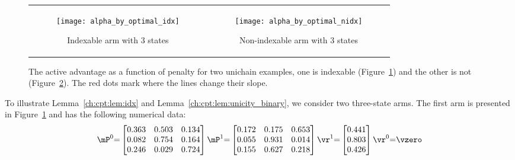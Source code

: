 \begin{figure}[ht]
    \begin{tabular}{cc}
        \begin{subfigure}[t]{0.48\linewidth}
            \texttt{[image: alpha\_by\_optimal\_idx]}
            \caption{Indexable arm with $3$ states}
            \label{fig:illustrate_vf}
        \end{subfigure}
        &\begin{subfigure}[t]{0.48\linewidth}
            \texttt{[image: alpha\_by\_optimal\_nidx]}
            \caption{Non-indexable arm with $3$ states}
            \label{fig:illustrate_non_indexable}
        \end{subfigure}            
    \end{tabular}
    \caption{
        The active advantage as a function of penalty for two unichain examples, one is indexable (Figure~\ref{fig:illustrate_vf}) and the other is not (Figure~\ref{fig:illustrate_non_indexable}).
        The red dots mark where the lines change their slope.
    }
    \label{fig:illustrate_indexability}
\end{figure}

To illustrate Lemma~\ref{ch:cpt:lem:idx} and Lemma~\ref{ch:cpt:lem:unicity_binary}, we consider two three-state arms.
The first arm is presented in Figure~\ref{fig:illustrate_vf} and has the following numerical data:
\begin{equation*}
    \mP^0{=}\begin{bmatrix}
        0.363 & 0.503 & 0.134 \\
        0.082 & 0.754 & 0.164 \\
        0.246 & 0.029 & 0.724
    \end{bmatrix}
    \mP^1{=}\begin{bmatrix}
        0.172 & 0.175 & 0.653 \\
        0.055 & 0.931 & 0.014 \\
        0.155 & 0.627 & 0.218
    \end{bmatrix}
    \vr^1{=}\begin{bmatrix}
        0.441 \\
        0.803 \\
        0.426
    \end{bmatrix}
    \vr^0{=}\vzero
\end{equation*}


